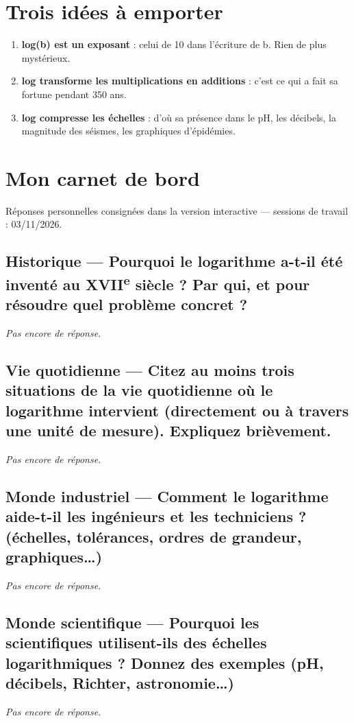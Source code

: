 \documentclass[11pt,a4paper]{article}
\begin{document}
\section{Trois idées à emporter}
\begin{enumerate}[leftmargin=1.6em,itemsep=2pt]
\item \textbf{log(b) est un exposant} : celui de 10 dans l'écriture de b. Rien de plus mystérieux.
\item \textbf{log transforme les multiplications en additions} : c'est ce qui a fait sa fortune pendant 350 ans.
\item \textbf{log compresse les échelles} : d'où sa présence dans le pH, les décibels, la magnitude des séismes, les graphiques d'épidémies.
\end{enumerate}

\newpage
\section{Mon carnet de bord}
Réponses personnelles consignées dans la version interactive --- sessions de travail : 03/11/2026.

\subsection*{Historique --- Pourquoi le logarithme a-t-il été inventé au XVII\textsuperscript{e} siècle ? Par qui, et pour résoudre quel problème concret ?}
\emph{Pas encore de réponse.}

\subsection*{Vie quotidienne --- Citez au moins trois situations de la vie quotidienne où le logarithme intervient (directement ou à travers une unité de mesure). Expliquez brièvement.}
\emph{Pas encore de réponse.}

\subsection*{Monde industriel --- Comment le logarithme aide-t-il les ingénieurs et les techniciens ? (échelles, tolérances, ordres de grandeur, graphiques\ldots{})}
\emph{Pas encore de réponse.}

\subsection*{Monde scientifique --- Pourquoi les scientifiques utilisent-ils des échelles logarithmiques ? Donnez des exemples (pH, décibels, Richter, astronomie\ldots{})}
\emph{Pas encore de réponse.}
\end{document}
